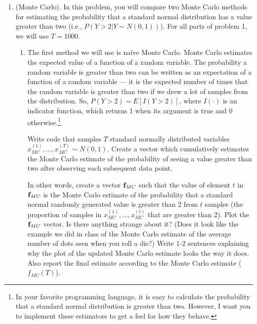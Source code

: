 \documentclass[11pt]{article}
\begin{document}
\begin{enumerate}
\item (Monte Carlo). In this problem, you will compare two Monte Carlo methods for estimating the probability that a standard normal distribution has a value greater than two (i.e., $P(Y > 2 | Y \sim N(0,1))$). For all parts of problem 1, we will use $T=1000$.
\begin{enumerate}
\item The first method we will use is na\"{i}ve Monte Carlo. Monte Carlo estimates the expected value of a function of a random variable. The probability a random variable is greater than two can be written as an expectation of a function of a random variable --- it is the expected number of times that the random variable is greater than two if we drew a lot of samples from the distribution. So, $P(Y > 2) = E[I(Y>2)]$, where $I(\cdot)$ is an indicator function, which returns 1 when its argument is true and 0 otherwise.\footnote{In your favorite programming language, it is easy to calculate the probability that a standard normal distribution is greater than two. However, I want you to implement these estimators to get a feel for how they behave.}

Write code that samples $T$ standard normally distributed variables $x_{MC}^{(1)},\ldots, x_{MC}^{(T)} \sim N(0,1)$. Create a vector which cumulatively estimates the Monte Carlo estimate of the probability of seeing a value greater than two after observing each subsequent data point.

In other words, create a vector ${\bf f}_{MC}$ such that the value of element $t$ in ${\bf f}_{MC}$ is the Monte Carlo estimate of the probability that a standard normal randomly generated value is greater than 2 from $t$ samples (the proportion of samples in $x_{MC}^{(1)},\ldots, x_{MC}^{(t)}$ that are greater than 2). Plot the ${\bf f}_{MC}$ vector. Is there anything strange about it? (Does it look like the example we did in class of the Monte Carlo estimate of the average number of dots seen when you roll a die?) Write 1-2 sentences explaining why the plot of the updated Monte Carlo estimate looks the way it does. Also report the final estimate according to the Monte Carlo estimate ($f_{MC}(T)$).


\end{enumerate}
\end{enumerate}
\end{document}
